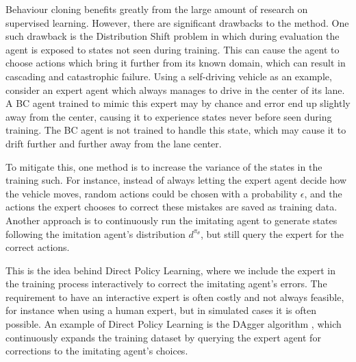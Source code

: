 Behaviour cloning benefits greatly from the large amount of research on supervised learning. 
However, there are significant drawbacks to the method.
One such drawback is the 
Distribution Shift problem \cite{wensun:il}
in which during evaluation the agent is exposed to states
not seen during training.
This can cause the agent to choose actions which bring it further from its known domain,
which can result in cascading and catastrophic failure.
Using a self-driving vehicle as an example,
consider an expert agent which always manages to drive in the center of its lane.
A BC agent trained to mimic this expert may by chance and error end up slightly away from the center,
causing it to experience states never before seen during training.
The BC agent is not trained to handle this state,
which may cause it to drift further and further away from the lane center.

To mitigate this,
one method is to increase the variance of the states in the training such.
For instance,
instead of always letting the expert agent decide how the vehicle moves,
random actions could be chosen with a probability $\epsilon$,
and the actions the expert chooses to correct these mistakes are saved as training data.
Another approach is to continuously run the imitating agent to generate states
following the imitation agent's distribution $d^{\pi_{\theta}}$,
but still query the expert for the correct actions.

This is the idea behind Direct Policy Learning,
where we include the expert in the training process interactively
to correct the imitating agent's errors.
The requirement to have an interactive expert is often costly and not always feasible,
for instance when using a human expert,
but in simulated cases it is often possible.
An example of Direct Policy Learning
is the DAgger algorithm \cite{dagger},
which continuously expands the training dataset
by querying the expert agent for corrections to the imitating agent's choices.

